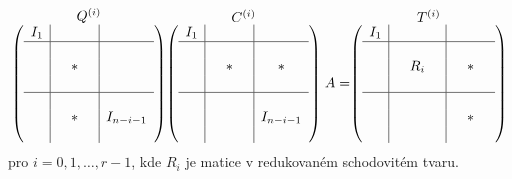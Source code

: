 \begin{align} \label{block_form}
    \stackrel{\mbox{$Q^{(i)}$}}{
        \left(
        \begin{array}{c|ccc|c}
          I_1 & &      & &  \\ \hline
              & &      & &  \\
              & & \ast & &  \\
              & &      & &  \\ \hline
              & &      & &  \\
              & & \ast & & I_{n - i - 1} \\
              & &      & &  \\
        \end{array}
        \right)
    }
    \stackrel{\mbox{$C^{(i)}$}}{
        \left(
        \begin{array}{c|ccc|c}
          I_1 & &      & &  \\ \hline
              & &      & &  \\
              & & \ast & & \ast \\
              & &      & &  \\ \hline
              & &      & &  \\
              & &      & & I_{n - i - 1} \\
              & &      & &  \\
        \end{array}
        \right)
    }
    A =
    \stackrel{\mbox{$T^{(i)}$}}{
        \left(
        \begin{array}{c|ccc|ccc}
          I_1 & &     &    & &      & \\ \hline
              & &     &    & &      & \\
              & & R_i &    & & \ast & \\
              & &     &    & &      & \\ \hline
              & &     &    & &      & \\
              & &     &    & & \ast & \\
              & &     &    & &      & \\
        \end{array}
        \right)
    }
\end{align}
pro $ i = 0, 1, \dots, r-1 $, kde $ R_i $ je matice v redukovaném schodovitém
tvaru.

